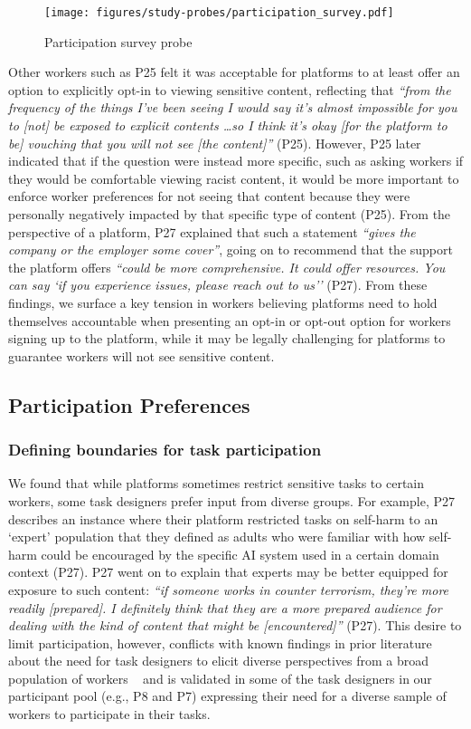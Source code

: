\begin{figure}[htbp]
    \centering
    \texttt{[image: figures/study-probes/participation\_survey.pdf]}     
    \caption{Participation survey probe}
    \label{fig:participation-survey} 
\end{figure}

Other workers such as P25 felt it was acceptable for platforms to at least offer an option to explicitly opt-in to viewing sensitive content, reflecting that \textit{``from the frequency of the things I've been seeing I would say it's almost impossible for you to [not] be exposed to explicit contents \dots so I think it's okay [for the platform to be] vouching that you will not see [the content]''} (P25). However, P25 later indicated that if the question were instead more specific, such as asking workers if they would be comfortable viewing racist content, it would be more important to enforce worker preferences for not seeing that content because they were personally negatively impacted by that specific type of content (P25). From the perspective of a platform, P27 explained that such a statement \textit{``gives the company or the employer some cover''}, going on to recommend that the support the platform offers \textit{``could be more comprehensive. It could offer resources. You can say `if you experience issues, please reach out to us''} (P27). From these findings, we surface a key tension in workers believing platforms need to hold themselves accountable when presenting an opt-in or opt-out option for workers signing up to the platform, while it may be legally challenging for platforms to guarantee workers will not see sensitive content.
 
\subsection{Participation Preferences}
\subsubsection{Defining boundaries for task participation}
We found that while platforms sometimes restrict sensitive tasks to certain workers, some task designers prefer input from diverse groups. For example, P27 describes an instance where their platform restricted tasks on self-harm to an `expert' population that they defined as adults who were familiar with how self-harm could be encouraged by the specific AI system used in a certain domain context (P27). P27 went on to explain that experts may be better equipped for exposure to such content: \textit{``if someone works in counter terrorism, they're more readily [prepared]. I definitely think that they are a more prepared audience for dealing with the kind of content that might be [encountered]''} (P27). This desire to limit participation, however, conflicts with known findings in prior literature about the need for task designers to elicit diverse perspectives from a broad population of workers ~\cite{qian2025locating} and is validated in some of the task designers in our participant pool (e.g., P8 and P7) expressing their need for a diverse sample of workers to participate in their tasks. 

